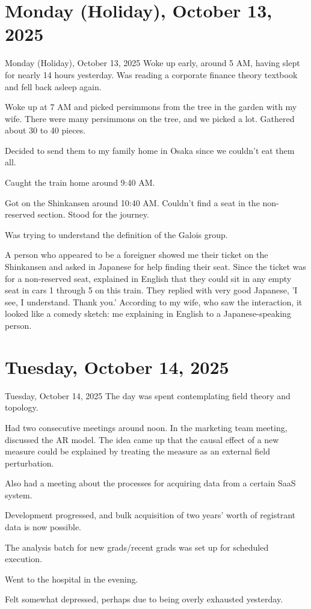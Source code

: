 \documentclass[dvipdfmx, autodetect-engine, aspectratio=169, 10.5pt]{beamer}
\begin{document}
\section{Monday (Holiday), October 13, 2025}

\begin{frame}{Monday (Holiday), October 13, 2025}
	Woke up early, around 5 AM, having slept for nearly 14 hours yesterday.
	Was reading a corporate finance theory textbook and fell back asleep again.

	Woke up at 7 AM and picked persimmons from the tree in the garden with my wife.
	There were many persimmons on the tree, and we picked a lot.
	Gathered about 30 to 40 pieces.

	Decided to send them to my family home in Osaka since we couldn't eat them all.

	Caught the train home around 9:40 AM.

	Got on the Shinkansen around 10:40 AM.
	Couldn't find a seat in the non-reserved section.
	Stood for the journey.

	Was trying to understand the definition of the Galois group.

	A person who appeared to be a foreigner showed me their ticket on the Shinkansen and asked in Japanese for help finding their seat.
	Since the ticket was for a non-reserved seat, explained in English that they could sit in any empty seat in cars 1 through 5 on this train.
	They replied with very good Japanese, 'I see, I understand. Thank you.'
	According to my wife, who saw the interaction, it looked like a comedy sketch: me explaining in English to a Japanese-speaking person.
\end{frame}

\section{Tuesday, October 14, 2025}

\begin{frame}{Tuesday, October 14, 2025}
	The day was spent contemplating field theory and topology.

	Had two consecutive meetings around noon.
	In the marketing team meeting, discussed the AR model.
	The idea came up that the causal effect of a new measure could be explained by treating the measure as an external field perturbation.

	Also had a meeting about the processes for acquiring data from a certain SaaS system.

	Development progressed, and bulk acquisition of two years' worth of registrant data is now possible.

	The analysis batch for new grads/recent grads was set up for scheduled execution.

	Went to the hospital in the evening.

	Felt somewhat depressed, perhaps due to being overly exhausted yesterday.
\end{frame}
\end{document}
